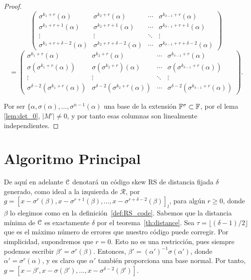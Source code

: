 \begin{proof}
\[
\begin{pmatrix}
    \sigma^{k_1+r}(\alpha) & \sigma^{k_2+r}(\alpha) & \cdots & \sigma^{k_{\delta-1}+r}(\alpha) \\
    \sigma^{k_1+r+1}(\alpha) & \sigma^{k_2+r+1}(\alpha) & \cdots & \sigma^{k_{\delta-1}+r+1}(\alpha) \\
    \vdots & \vdots & \ddots & \vdots \\
    \sigma^{k_1+r+\delta-2}(\alpha) & \sigma^{k_2+r+\delta-2}(\alpha) & \cdots & \sigma^{k_{\delta-1}+r+\delta-2}(\alpha)
\end{pmatrix}
\]
\[
=
\begin{pmatrix}
    \sigma^{k_1+r}(\alpha) & \sigma^{k_2+r}(\alpha) & \cdots & \sigma^{k_{\delta-1}+r}(\alpha) \\
    \sigma(\sigma^{k_1+r}(\alpha)) & \sigma(\sigma^{k_2+r})(\alpha) & \cdots & \sigma(\sigma^{k_{\delta-1}+r}(\alpha)) \\
    \vdots & \vdots & \ddots & \vdots \\
    \sigma^{\delta-2}(\sigma^{k_1+r}(\alpha)) & \sigma^{\delta-2}(\sigma^{k_2+r}(\alpha)) & \cdots & \sigma^{\delta-2}(\sigma^{k_{\delta-1}+r}(\alpha))
\end{pmatrix}
.\]

Por ser \(\{\alpha, \sigma(\alpha), \dots, \sigma^{n-1}(\alpha)\) una base de la extensión \(\mathbb{F}^\sigma \subset \mathbb{F}\), por el lema \ref{lem:det_0}, \(|M'| \neq 0\), y por tanto esas columnas son linealmente independientes.
\end{proof}

\section{Algoritmo Principal}%
\label{sec:algoritmo_principal}

De aquí en adelante \(\mathcal{C}\) denotará un código skew RS de distancia fijada \(\delta\) generado, como ideal a la izquierda de  \(\mathcal{R}\), por  \(g = {[x - \sigma^r(\beta), x - \sigma^{r+1}(\beta), \dots, x - \sigma^{r+\delta - 2}(\beta)]}_l\), para algún \(r \geq 0 \), donde \(\beta\) lo elegimos como en la definición~\ref{def:RS_code}. Sabemos que la distancia mínima de \(\mathcal{C}\) es exactamente \(\delta\) por el teorema~\ref{th:distance}. Sea \(\tau = \lfloor (\delta -1)/2 \rfloor\) que es el máximo número de errores que nuestro código puede corregir. Por simplicidad, supondremos que \(r = 0\). Esto no es una restricción, pues siempre podemos escribir  \(\beta' = \sigma^r(\beta)\). Entonces, \(\beta' = {(\alpha')}^{-1} \sigma(\alpha')\), donde \(\alpha' = \sigma^r(\alpha)\), y es claro que \(\alpha'\) también proporciona una base normal. Por tanto, \(g = [x - \beta', x - \sigma(\beta'), \dots, x - \sigma^{\delta - 2}(\beta')]\).

